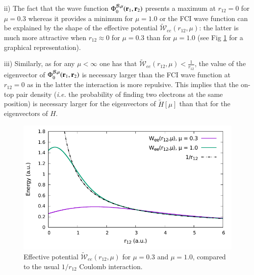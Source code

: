 \documentclass[aip,jcp,reprint,noshowkeys,superscriptaddress]{revtex4-1}
\newcommand{\matelem}[3]{\langle #1 | #2 | #3 \rangle}
\newcommand{\br}[0]{{\bf {r}}}
\newcommand{\psiex}[0]{\Psi^{\text{ex}}_0}
\newcommand{\phimub}[0]{\Phi^{\mathcal{B},\mu}_0}
\newcommand{\psimub}[0]{\Psi^{\mathcal{B},\mu}_0}
\begin{document}
ii) The fact that the wave function $\phimub(\br{}_1,\br{}_2)$ presents a maximum at $r_{12}=0$ for $\mu=0.3$ whereas it provides a minimum for $\mu=1.0$ or the FCI wave function can be explained by the shape of the effective potential $\tilde{\mathcal{W}}_{ee}(r_{12},\mu)$: the latter is much more attractive when $r_{12}\approx 0$ for $\mu=0.3$ than for $\mu = 1.0$ (see Fig \ref{fig_wee_compare} for a graphical representation). 

iii) Similarly, as for any $\mu < \infty$ one has that $\tilde{\mathcal{W}}_{ee}(r_{12},\mu) <\frac{1}{r_{12}}$, the value of the eigenvector of $\phimub(\br{}_1,\br{}_2)$ is necessary larger than the FCI wave function at $r_{12}=0$ as in the latter the interaction is more repulsive. This implies that the on-top pair density (\textit{i.e.} the probability of finding two electrons at the same position) is necessary larger for the eigenvectors of $\tilde{H}[\mu]$ than that for the eigenvectors of $H$.

\begin{figure}
 \label{fig_wee_compare}
        \includegraphics[width=0.45\linewidth]{plots/jastrow/w_ee_zoom.pdf}
        \caption{
        Effective potential $\tilde{\mathcal{W}}_{ee}(r_{12},\mu)$ for $\mu=0.3$ and $\mu=1.0$, compared to the usual $1/r_{12}$ Coulomb interaction.}
\end{figure}
\end{document}
